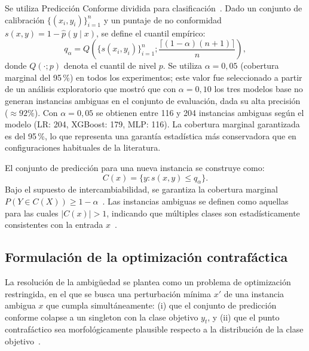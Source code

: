 \documentclass[conference]{IEEEtran}
\begin{document}
Se utiliza Predicción Conforme dividida para clasificación~\cite{b2,b3}.
Dado un conjunto de calibración $\{(x_i,y_i)\}_{i=1}^n$ y un puntaje
de no conformidad $s(x,y) = 1 - \hat{p}(y\mid x)$, se define el cuantil
empírico:
\begin{equation}
    q_{\alpha} = Q\!\left(\{s(x_i, y_i)\}_{i=1}^{n};
    \frac{\lceil (1-\alpha)(n+1) \rceil}{n}\right),
    \label{eq:qhat}
\end{equation}
donde $Q(\cdot; p)$ denota el cuantil de nivel $p$. Se utiliza
$\alpha = 0{,}05$ (cobertura marginal del 95\,\%) en todos los
experimentos; este valor fue seleccionado a partir de un análisis
exploratorio que mostró que con $\alpha = 0{,}10$ los tres modelos base
no generan instancias ambiguas en el conjunto de evaluación, dada su
alta precisión ($\approx 92\%$). Con $\alpha = 0{,}05$ se obtienen entre
116 y 204 instancias ambiguas según el modelo (LR: 204, XGBoost: 179,
MLP: 116). La cobertura marginal garantizada es del 95\,\%, lo que
representa una garantía estadística más conservadora que en
configuraciones habituales de la literatura.

El conjunto de predicción para una nueva instancia se construye como:
\begin{equation}
    C(x) = \{y : s(x, y) \leq q_{\alpha}\}.
    \label{eq:predset}
\end{equation}
Bajo el supuesto de intercambiabilidad, se garantiza la cobertura
marginal $P(Y \in C(X)) \geq 1 - \alpha$~\cite{b2}. Las instancias
ambiguas se definen como aquellas para las cuales $|C(x)| > 1$,
indicando que múltiples clases son estadísticamente consistentes con
la entrada $x$~\cite{b1}.

\subsection{Formulación de la optimización contrafáctica}

La resolución de la ambigüedad se plantea como un problema de
optimización restringida, en el que se busca una perturbación mínima
$x'$ de una instancia ambigua $x$ que cumpla simultáneamente: (i) que
el conjunto de predicción conforme colapse a un singleton con la clase
objetivo $y_t$, y (ii) que el punto contrafáctico sea morfológicamente
plausible respecto a la distribución de la clase objetivo~\cite{b4,b6}.
\end{document}
